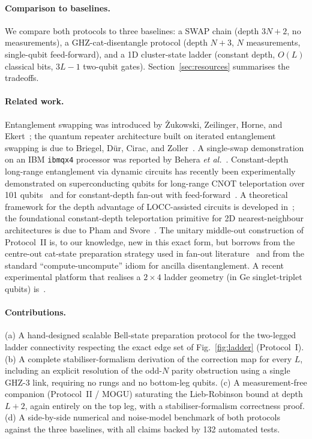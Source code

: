 \documentclass[11pt,a4paper]{article}
\theoremstyle{definition}
\begin{document}
\paragraph{Comparison to baselines.} We compare both protocols to three
baselines: a SWAP chain (depth $3N+2$, no measurements), a
GHZ-cat-disentangle protocol (depth $N+3$, $N$ measurements,
single-qubit feed-forward), and a 1D cluster-state ladder
(constant depth, $O(L)$ classical bits, $3L-1$ two-qubit gates).
Section~\ref{sec:resources} summarises the tradeoffs.

\paragraph{Related work.} Entanglement swapping was introduced by
Żukowski, Zeilinger, Horne, and
Ekert~\cite{ZukowskiZeilinger1993}; the quantum repeater architecture
built on iterated entanglement swapping is due to Briegel, Dür, Cirac,
and Zoller~\cite{BDCZ1998}. A single-swap demonstration on an IBM
\texttt{ibmqx4} processor was reported by Behera \textit{et
al.}~\cite{Behera2018}. Constant-depth long-range entanglement via
dynamic circuits has recently been experimentally demonstrated on
superconducting qubits for long-range CNOT teleportation over 101
qubits~\cite{Baumer2024} and for constant-depth fan-out with
feed-forward~\cite{Song2024}. A theoretical framework for the depth
advantage of LOCC-assisted circuits is developed in~\cite{Yan2024}; the
foundational constant-depth teleportation primitive for 2D
nearest-neighbour architectures is due to Pham and
Svore~\cite{PhamSvore2013}. The unitary middle-out construction of
Protocol~II is, to our knowledge, new in this exact form, but borrows
from the centre-out cat-state preparation strategy used in fan-out
literature~\cite{Song2024} and from the standard ``compute-uncompute''
idiom for ancilla disentanglement. A recent experimental platform that
realises a $2\times 4$ ladder geometry (in Ge singlet-triplet qubits)
is~\cite{Zhang2024}.

\paragraph{Contributions.}
(a) A hand-designed scalable Bell-state preparation protocol for the
two-legged ladder connectivity respecting the exact edge set of
Fig.~\ref{fig:ladder} (Protocol~I).
(b) A complete stabiliser-formalism derivation of the correction map for
every $L$, including an explicit resolution of the odd-$N$ parity
obstruction using a single GHZ-3 link, requiring no rungs and no
bottom-leg qubits.
(c) A measurement-free companion (Protocol~II / MOGU) saturating the
Lieb-Robinson bound at depth $L+2$, again entirely on the top leg, with
a stabiliser-formalism correctness proof.
(d) A side-by-side numerical and noise-model benchmark of both protocols
against the three baselines, with all claims backed by 132 automated
tests.
\end{document}
